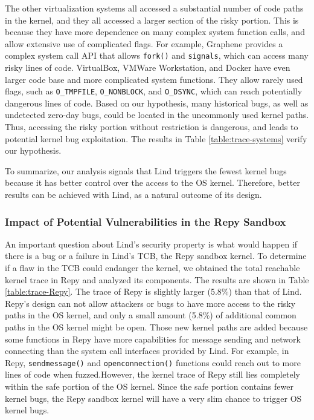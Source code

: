 {The other virtualization systems all accessed a substantial number of code
paths in the kernel,
and they all accessed a larger section of the risky portion.
This is because they have
more dependence on many complex system function calls, and
allow extensive use of complicated flags. For example,
Graphene provides a complex system call API that allows
\texttt{fork()} and \texttt{signals}, which can access many risky lines of code.
VirtualBox, VMWare Workstation, and Docker have even larger
code base and more complicated system functions. They allow
rarely used flags, such as \texttt{O\_TMPFILE}, \texttt{O\_NONBLOCK},
and \texttt{O\_DSYNC}, which can reach potentially dangerous lines
of code.
%
Based on our hypothesis, many historical bugs, as well as undetected
zero-day bugs, could be located in the uncommonly used kernel paths.
Thus, accessing the risky portion without restriction is dangerous, and
leads to potential kernel bug exploitation. The results in Table
\ref{table:trace-systems} verify our hypothesis.

To summarize, our analysis signals that Lind triggers the fewest kernel bugs because
it has better control over the access to the OS kernel.
Therefore, better results can be achieved with Lind, as a natural
outcome of its design.

\subsubsection{Impact of Potential Vulnerabilities in the Repy Sandbox}
\label{Reachable-Kernel-Trace-Analysis-for-Repy-Sandbox}

An important question about Lind's security property is what would happen if
there is a bug or a failure in Lind's TCB,
the Repy sandbox kernel. To determine if a flaw in the TCB could endanger the kernel,
we obtained the total reachable kernel trace in Repy and analyzed its
components.
The results are shown in Table \ref{table:trace-Repy}. The trace of Repy is
slightly larger (5.8\%) than that of Lind.
Repy's design can not allow attackers or bugs to
have more access to the risky paths in the OS kernel, and only a small amount (5.8\%) of
additional common paths in the OS kernel might be open.
Those new kernel paths are added because some functions in Repy
have more capabilities for message sending and network connecting than the system call interfaces
provided by Lind. For example, in Repy,
\texttt{sendmessage()} and \texttt{openconnection()}
functions could reach out to more lines of code when fuzzed.However, the kernel
 trace of Repy still lies completely within the safe
portion of the OS kernel.
Since the safe portion contains fewer kernel bugs, the Repy sandbox kernel
will have a very slim chance to trigger OS kernel bugs.

}
